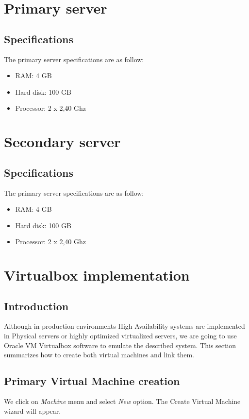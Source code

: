 \section {Primary server}
\subsection {Specifications}
The primary server specifications are as follow:
\begin{itemize}
  \item RAM: 4 GB
  \item Hard disk: 100 GB
  \item Processor: 2 x 2,40 Ghz
\end{itemize}

\section {Secondary server}
\subsection {Specifications}
The primary server specifications are as follow:
\begin{itemize}
  \item RAM: 4 GB
  \item Hard disk: 100 GB
  \item Processor: 2 x 2,40 Ghz
\end{itemize}

\section {\label{sec:virtualbox-implementation}Virtualbox implementation}
\subsection {Introduction}
Although in production environments High Availability systems are implemented in Physical servers or highly optimized virtualized servers, we are going to use Oracle VM Virtualbox software to emulate the described system. This section summarizes how to create both virtual machines and link them.

\subsection {\label{subsec:primary-virtual-machine-creation}Primary Virtual Machine creation}
We click on \textit{Machine} menu and select \textit{New} option. The Create Virtual Machine wizard will appear.

